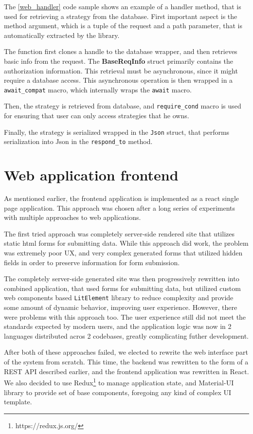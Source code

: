 The \autoref{web_handler} code sample shows an example of a handler method, that is used for retrieving a strategy from the database.
First important aspect is the method argument, which is a tuple of the request and a path parameter, that is automatically extracted by
the library.

The function first clones a handle to the database wrapper, and then retrieves basic info from the request.
The \textbf{BaseReqInfo} struct primarily contains the authorization information. This retrieval must be asynchronous,
since it might require a database access. This asynchronous operation is then wrapped in a \verb|await_compat| macro, which internally wraps
the \verb|await| macro.

Then, the strategy is retrieved from database, and \verb|require_cond| macro is used for ensuring that user can only access strategies that he owns.

Finally, the strategy is serialized wrapped in the \verb|Json| struct, that performs serialization into Json in the
\verb|respond_to| method.

\section{Web application frontend}
As mentioned earlier, the frontend application is implemented as a react single page application.
This approach was chosen after a long series of experiments with multiple approaches to web applications.

The first tried approach was completely server-side rendered site that utilizes static html forms for
submitting data. While this approach did work, the problem was extremely poor UX, and very complex generated forms that utilized hidden fields in order to preserve information
for form submission.

The completely server-side generated site was then progressively rewritten into combined
application, that used forms for submitting data, but utilized custom web components
based \verb|LitElement| library to reduce complexity and provide some amount of dynamic behavior, improving
user experience. However, there were problems with this approach too. The user experience still did not meet the
standards expected by modern users, and the application logic was now in 2 languages distributed acros 2 codebases,
greatly complicating futher development.

After both of these approaches failed, we elected to rewrite the web interface part of the system from scratch.
This time, the backend was rewritten to the form of a REST API described earlier, and the frontend application
was rewritten in React. We also decided to use Redux\footnote{https://redux.js.org/} to manage application state,
and Material-UI library to provide set of base components, foregoing any kind of complex UI template.

